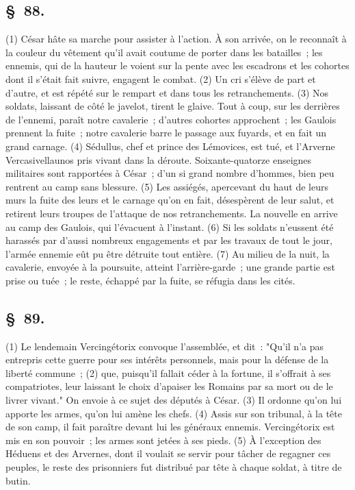 \documentclass[french,twoside]{book} %
\begin{document}
\subsection[{§ 88.}]{ \textsc{§ 88.} }
\noindent (1) César hâte sa marche pour assister à l’action. À son arrivée, on le reconnaît à la couleur du vêtement qu’il avait coutume de porter dans les batailles ; les ennemis, qui de la hauteur le voient sur la pente avec les escadrons et les cohortes dont il s’était fait suivre, engagent le combat. (2) Un cri s’élève de part et d’autre, et est répété sur le rempart et dans tous les retranchements. (3) Nos soldats, laissant de côté le javelot, tirent le glaive. Tout à coup, sur les derrières de l’ennemi, paraît notre cavalerie ; d’autres cohortes approchent ; les Gaulois prennent la fuite ; notre cavalerie barre le passage aux fuyards, et en fait un grand carnage. (4) Sédullus, chef et prince des Lémovices, est tué, et l’Arverne Vercasivellaunos pris vivant dans la déroute. Soixante-quatorze enseignes militaires sont rapportées à César ; d’un si grand nombre d’hommes, bien peu rentrent au camp sans blessure. (5) Les assiégés, apercevant du haut de leurs murs la fuite des leurs et le carnage qu’on en fait, désespèrent de leur salut, et retirent leurs troupes de l’attaque de nos retranchements. La nouvelle en arrive au camp des Gaulois, qui l’évacuent à l’instant. (6) Si les soldats n’eussent été harassés par d’aussi nombreux engagements et par les travaux de tout le jour, l’armée ennemie eût pu être détruite tout entière. (7) Au milieu de la nuit, la cavalerie, envoyée à la poursuite, atteint l’arrière-garde ; une grande partie est prise ou tuée ; le reste, échappé par la fuite, se réfugia dans les cités.
\subsection[{§ 89.}]{ \textsc{§ 89.} }
\noindent (1) Le lendemain Vercingétorix convoque l’assemblée, et dit : "Qu'il n’a pas entrepris cette guerre pour ses intérêts personnels, mais pour la défense de la liberté commune ; (2) que, puisqu’il fallait céder à la fortune, il s’offrait à ses compatriotes, leur laissant le choix d’apaiser les Romains par sa mort ou de le livrer vivant." On envoie à ce sujet des députés à César. (3) Il ordonne qu’on lui apporte les armes, qu’on lui amène les chefs. (4) Assis sur son tribunal, à la tête de son camp, il fait paraître devant lui les généraux ennemis. Vercingétorix est mis en son pouvoir ; les armes sont jetées à ses pieds. (5) À l’exception des Héduens et des Arvernes, dont il voulait se servir pour tâcher de regagner ces peuples, le reste des prisonniers fut distribué par tête à chaque soldat, à titre de butin.
\end{document}
